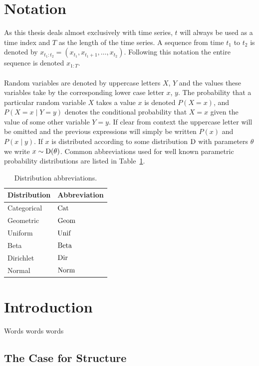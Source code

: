 \documentclass[12pt]{report}
\newcommand{\1}[0]{\mathbbm{1}}
\newcommand{\Beta}[0]{\textnormal{Beta}}
\newcommand{\Unif}[0]{\textnormal{Unif}}
\newcommand{\Cat}[0]{\textnormal{Cat}}
\newcommand{\Dir}[0]{\textnormal{Dir}}
\newcommand{\Norm}[0]{\textnormal{Norm}}
\newcommand{\SomeDist}[0]{\textnormal{D}}
\newcommand{\Geom}[0]{\textnormal{Geom}}
\newcommand{\seq}[3]{\ensuremath{#1_{{#2}:{#3}}}}
\begin{document}
\cleardoublepage
{}
\chapter*{Notation}
As this thesis deals almost exclusively with time series, $t$ will always
be used as a time index and $T$ as the length of the time series.
A sequence from time $t_1$ to $t_2$ is denoted by
$\seq{x}{t_1}{t_2} = (x_{t_1}, x_{t_1 + 1}, \ldots, x_{t_2})$.
Following this notation the entire sequence is denoted $\seq{x}{1}{T}$.
\\\\
Random variables are denoted by uppercase letters $X$, $Y$
and the values these variables take by the corresponding lower case
letter $x$, $y$. The probability that a particular random variable $X$
takes a value $x$ is denoted $P(X=x)$, and $P(X=x \mid Y=y)$ denotes
the conditional probability that $X=x$ given the value of some other variable $Y=y$.
If clear from context the uppercase letter will be omitted and the previous expressions
will simply be written $P(x)$ and $P(x \mid y)$. If $x$ is distributed according to some
distribution $\SomeDist$ with parameters $\theta$ we write $x \sim \SomeDist(\theta)$.
Common abbreviations used for well known parametric probability distributions are listed
in Table~\ref{table:distributions}.
\begin{table}[ht]
    \centering
    \begin{tabular}{l l}\hline
    \textbf{Distribution} & \textbf{Abbreviation}\\\hline
    Categorical & $\Cat$ \\
    Geometric & $\Geom$ \\
    Uniform & $\Unif$ \\
    Beta & $\Beta$ \\
    Dirichlet & $\Dir$ \\
    Normal & $\Norm$ \\
    \end{tabular}
    \caption[Distributions]{Distribution abbreviations.}
    \label{table:distributions}
\end{table}


\chapter{Introduction}
\label{chap:Introduction}
Words words words

\section{The Case for Structure}
\end{document}
